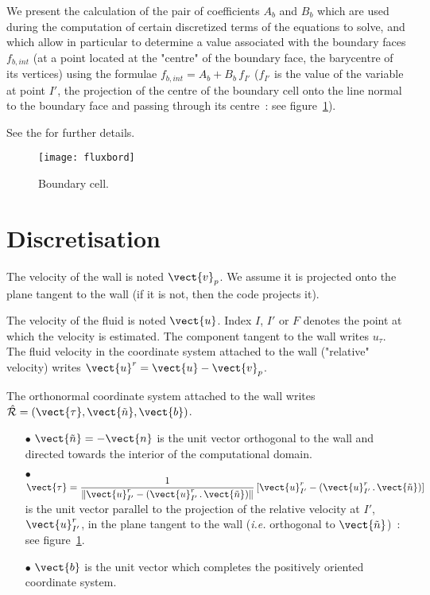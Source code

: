 We present the calculation of the pair of coefficients $A_b$ and $B_b$ which are used during the computation of certain discretized terms of the equations to solve, and which allow in particular to determine a value associated with the boundary faces $f_{b,int}$ (at a point located at the "centre" of the boundary face, the barycentre of its vertices) using the formulae   $f_{b,int} = A_b+B_b\,f_{I'}$ ($f_{I'}$ is the value of the variable at point $I'$, the projection of the centre of the boundary cell onto the line normal to the boundary face and passing through its centre~: see figure~\ref{Base_Clptur_fig_flux_clptur}).

See the  for further details.

\begin{figure}[h]
\centerline{\texttt{[image: fluxbord]}}
\caption{\label{Base_Clptur_fig_flux_clptur}Boundary cell.}
\end{figure}

\section*{Discretisation}

The velocity of the wall is noted
$\vect{v}_p$. We assume it is projected onto the plane tangent to the wall (if it is not, then the code projects it).


The velocity of the fluid is noted $\vect{u}$. Index $I$, $I'$ or $F$ denotes the point at which the velocity is estimated. The component tangent to the wall writes $u_\tau$. The fluid velocity in the coordinate system attached to the wall ("relative" velocity) writes $\vect{u}^r=\vect{u} - \vect{v}_p$.



The orthonormal coordinate system attached to the wall writes
$\hat {\mathcal R}=(\vect{\tau},\vect{\tilde{n}},\vect{b})$.
\begin{itemize}
\item [$\bullet$] $\vect{\tilde{n}}=-\vect{n}$ is the unit vector orthogonal to the wall and directed towards the interior of the computational domain.
\item [$\bullet$] $\vect{\tau} = \displaystyle\frac{1}{\|\vect{u}^r_{I'}-(\vect{u}^r_{I'}\,.\,\vect{\tilde{n}})\|}\left[\vect{u}^r_{I'}-(\vect{u}^r_{I'}\,.\,\vect{\tilde{n}})\right]$ is the unit vector parallel to the projection of the relative velocity at $I'$, $\vect{u}^r_{I'}$, in the plane tangent to the wall
 ({\it i.e.} orthogonal to $\vect{\tilde{n}}$)~: see
figure~\ref{Base_Clptur_fig_flux_clptur}.
\item [$\bullet$] $\vect{b}$ is the unit vector which completes the positively oriented coordinate system.
\end{itemize}
\vspace{0.2cm}

